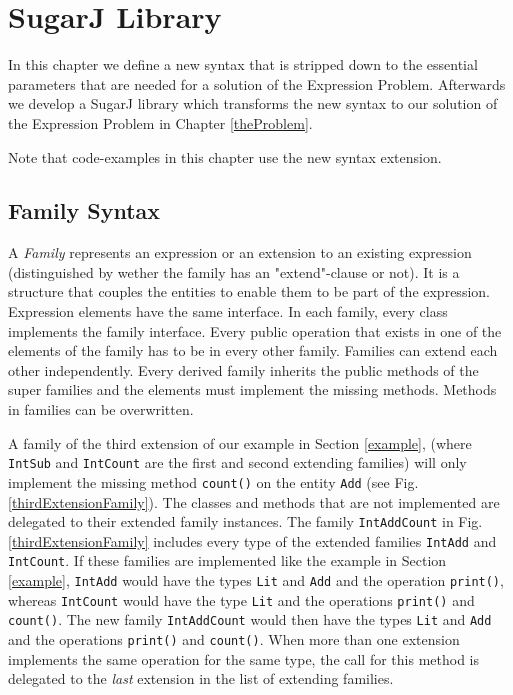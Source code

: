 \documentclass{report}
\begin{document}
\section{SugarJ Library}

In this chapter we define a new syntax that is stripped down to the essential parameters that are needed for a solution of the Expression Problem. Afterwards we develop a SugarJ library which transforms the new syntax to our solution of the Expression Problem in Chapter \ref{theProblem}.

Note that code-examples in this chapter use the new syntax extension.

\subsection{Family Syntax}

A \emph{Family} represents an expression or an extension to an existing expression (distinguished by wether the family has an "extend"-clause or not). It is a structure that couples the entities to enable them to be part of the expression. Expression elements have the same interface. In each family, every class implements the family interface. Every public operation that exists in one of the elements of the family has to be in every other family. Families can extend each other independently. Every derived family inherits the public methods of the super families and the elements must implement the missing methods. Methods in families can be overwritten.

A family of the third extension of our example in Section \ref{example}, (where \lstinline{IntSub} and \lstinline{IntCount} are the first and second extending families) will only implement the missing method \lstinline{count()} on the entity \lstinline{Add} (see Fig. \ref{thirdExtensionFamily}). The classes and methods that are not implemented are delegated to their extended family instances. The family \lstinline{IntAddCount} in Fig. \ref{thirdExtensionFamily} includes every type of the extended families \lstinline{IntAdd} and \lstinline{IntCount}. If these families are implemented like the example in Section \ref{example}, \lstinline{IntAdd} would have the types \lstinline{Lit} and \lstinline{Add} and the operation \lstinline{print()}, whereas \lstinline{IntCount} would have the type \lstinline{Lit} and the operations \lstinline{print()} and \lstinline{count()}. The new family \lstinline{IntAddCount} would then have the types \lstinline{Lit} and \lstinline{Add} and the operations \lstinline{print()} and \lstinline{count()}. When more than one extension implements the same operation for the same type, the call for this method is delegated to the \emph{last} extension in the list of extending families.
\end{document}
